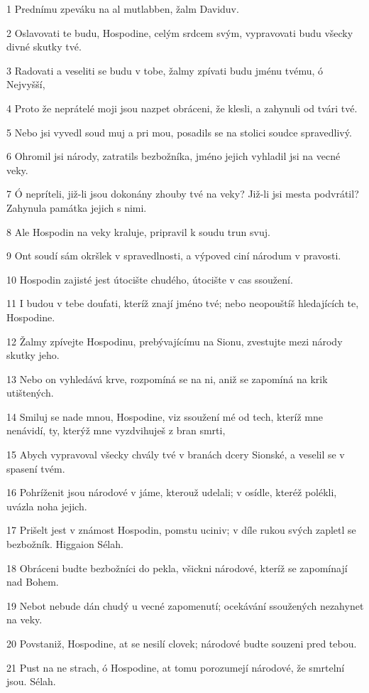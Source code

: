 \par 1 Prednímu zpeváku na al mutlabben, žalm Daviduv.
\par 2 Oslavovati te budu, Hospodine, celým srdcem svým, vypravovati budu všecky divné skutky tvé.
\par 3 Radovati a veseliti se budu v tobe, žalmy zpívati budu jménu tvému, ó Nejvyšší,
\par 4 Proto že neprátelé moji jsou nazpet obráceni, že klesli, a zahynuli od tvári tvé.
\par 5 Nebo jsi vyvedl soud muj a pri mou, posadils se na stolici soudce spravedlivý.
\par 6 Ohromil jsi národy, zatratils bezbožníka, jméno jejich vyhladil jsi na vecné veky.
\par 7 Ó nepríteli, již-li jsou dokonány zhouby tvé na veky? Již-li jsi mesta podvrátil? Zahynula památka jejich s nimi.
\par 8 Ale Hospodin na veky kraluje, pripravil k soudu trun svuj.
\par 9 Ont soudí sám okršlek v spravedlnosti, a výpoved ciní národum v pravosti.
\par 10 Hospodin zajisté jest útocište chudého, útocište v cas ssoužení.
\par 11 I budou v tebe doufati, kteríž znají jméno tvé; nebo neopouštíš hledajících te, Hospodine.
\par 12 Žalmy zpívejte Hospodinu, prebývajícímu na Sionu, zvestujte mezi národy skutky jeho.
\par 13 Nebo on vyhledává krve, rozpomíná se na ni, aniž se zapomíná na krik utištených.
\par 14 Smiluj se nade mnou, Hospodine, viz ssoužení mé od tech, kteríž mne nenávidí, ty, kterýž mne vyzdvihuješ z bran smrti,
\par 15 Abych vypravoval všecky chvály tvé v branách dcery Sionské, a veselil se v spasení tvém.
\par 16 Pohríženit jsou národové v jáme, kterouž udelali; v osídle, kteréž polékli, uvázla noha jejich.
\par 17 Prišelt jest v známost Hospodin, pomstu uciniv; v díle rukou svých zapletl se bezbožník. Higgaion Sélah.
\par 18 Obráceni budte bezbožníci do pekla, všickni národové, kteríž se zapomínají nad Bohem.
\par 19 Nebot nebude dán chudý u vecné zapomenutí; ocekávání ssoužených nezahynet na veky.
\par 20 Povstaniž, Hospodine, at se nesilí clovek; národové budte souzeni pred tebou.
\par 21 Pust na ne strach, ó Hospodine, at tomu porozumejí národové, že smrtelní jsou. Sélah.

